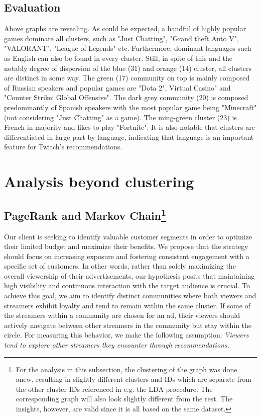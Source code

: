 \documentclass[11pt, oneside]{article}   	%
\begin{document}
\subsection{Evaluation}
Above graphs are revealing. As could be expected, a handful of highly popular games dominate all clusters, such as "Just Chatting", "Grand theft Auto V", "VALORANT", "League of Legends" etc. Furthermore, dominant languages such as English can also be found in every cluster.
Still, in spite of this and the notably degree of dispersion of the blue (31) and orange (14) cluster, all clusters are distinct in some way. 
\newline
The green (17) community on top is mainly composed of Russian speakers and popular games are "Dota 2", Virtual Casino" and "Counter Strike: Global Offensive". The dark grey community (20) is composed predominantly of Spanish speakers with the most popular game being "Minecraft" (not considering "Just Chatting" as a game). The ming-green cluster (23) is French in majority and likes to play "Fortnite".
\newline
It is also notable that clusters are differentiated in large part by language, indicating that language is an important feature for Twitch's recommendations. 

\newpage
\section{Analysis beyond clustering}
\subsection{PageRank and Markov Chain\protect\footnote{For the analysis in this subsection, the clustering of the graph was done anew, resulting in slightly different clusters and IDs which are separate from the other cluster IDs referenced in e.g. the LDA procedure. The corresponding graph will also look slightly different from the rest. The insights, however, are valid since it is all based on the same dataset.}}
Our client is seeking to identify valuable customer segments in order to optimize their limited budget and maximize their benefits. We propose that the strategy should focus on increasing exposure and fostering consistent engagement with a specific set of customers. In other words, rather than solely maximizing the overall viewership of their advertisements, our hypothesis posits that maintaining high visibility and continuous interaction with the target audience is crucial. To achieve this goal, we aim to identify distinct communities where both viewers and streamers exhibit loyalty and tend to remain within the same cluster. If some of the streamers within a community are chosen for an ad, their viewers should actively navigate between other streamers in the community but stay within the circle. For measuring this behavior, we make the following assumption: \textit{Viewers tend to explore other streamers they encounter through recommendations}.
\end{document}
